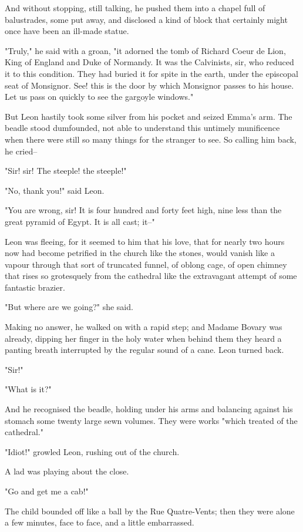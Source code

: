 \documentclass{tufte-book}
\begin{document}
And without stopping, still talking, he pushed them into a chapel
full of balustrades, some put away, and disclosed a kind of block that
certainly might once have been an ill-made statue.

"Truly," he said with a groan, "it adorned the tomb of Richard Coeur de
Lion, King of England and Duke of Normandy. It was the Calvinists, sir,
who reduced it to this condition. They had buried it for spite in the
earth, under the episcopal seat of Monsignor. See! this is the door by
which Monsignor passes to his house. Let us pass on quickly to see the
gargoyle windows."

But Leon hastily took some silver from his pocket and seized Emma's
arm. The beadle stood dumfounded, not able to understand this untimely
munificence when there were still so many things for the stranger to
see. So calling him back, he cried--

"Sir! sir! The steeple! the steeple!"

"No, thank you!" said Leon.

"You are wrong, sir! It is four hundred and forty feet high, nine less
than the great pyramid of Egypt. It is all cast; it--"

Leon was fleeing, for it seemed to him that his love, that for nearly
two hours now had become petrified in the church like the stones, would
vanish like a vapour through that sort of truncated funnel, of oblong
cage, of open chimney that rises so grotesquely from the cathedral like
the extravagant attempt of some fantastic brazier.

"But where are we going?" she said.

Making no answer, he walked on with a rapid step; and Madame Bovary
was already, dipping her finger in the holy water when behind them they
heard a panting breath interrupted by the regular sound of a cane. Leon
turned back.

"Sir!"

"What is it?"

And he recognised the beadle, holding under his arms and balancing
against his stomach some twenty large sewn volumes. They were works
"which treated of the cathedral."

"Idiot!" growled Leon, rushing out of the church.

A lad was playing about the close.

"Go and get me a cab!"

The child bounded off like a ball by the Rue Quatre-Vents; then they
were alone a few minutes, face to face, and a little embarrassed.
\end{document}
